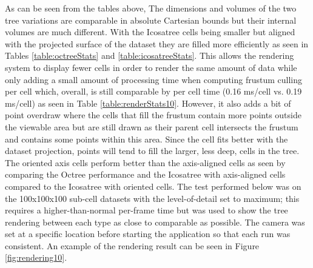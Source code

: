 As can be seen from the tables above, The dimensions and volumes of the two tree
variations are comparable in absolute Cartesian bounds but their internal
volumes are much different. With the Icosatree cells being smaller but aligned
with the projected surface of the dataset they are filled more efficiently as
seen in Tables \ref{table:octreeStats} and \ref{table:icosatreeStats}. This
allows the rendering system to display fewer cells in order to render the same
amount of data while only adding a small amount of processing time when
computing frustum culling per cell which, overall, is still comparable by per
cell time (0.16 ms/cell vs. 0.19 ms/cell) as seen in Table
\ref{table:renderStats10}. However, it also adds a bit of point overdraw where
the cells that fill the frustum contain more points outside the viewable area
but are still drawn as their parent cell intersects the frustum and contains
some points within this area. Since the cell fits better with the dataset
projection, points will tend to fill the larger, less deep, cells in the tree.
The oriented axis cells perform better than the axis-aligned cells as seen by
comparing the Octree performance and the Icosatree with axis-aligned cells
compared to the Icosatree with oriented cells. The test performed below was on
the 100x100x100 sub-cell datasets with the level-of-detail set to maximum; this
requires a higher-than-normal per-frame time but was used to show the tree
rendering between each type as close to comparable as possible. The camera was
set at a specific location before starting the application so that each run was
consistent. An example of the rendering result can be seen in Figure
\ref{fig:rendering10}.

\begin{table}[htp]
\caption{Rendering Statistics}
\label{table:renderStats10}
\end{table}


